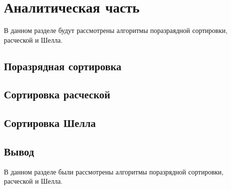 \chapter{Аналитическая часть}
В данном разделе будут рассмотрены алгоритмы поразраядной сортировки, расческой и Шелла.

\section{Поразрядная сортировка}


\section{Сортировка расческой}

\section{Сортировка Шелла}

\section*{Вывод}
В данном разделе были рассмотрены алгоритмы поразрядной сортировки, расческой и Шелла.